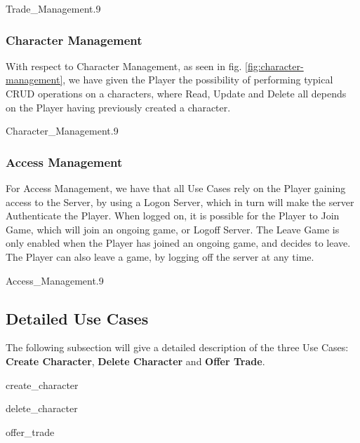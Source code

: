 \begin{myfigure}{Trade_Management}{.9}%
	\caption{Trade Management}
	\label{fig:trade-management}
\end{myfigure}

\subsubsection*{Character Management}
With respect to Character Management, as seen in fig. \ref{fig:character-management}, we have given the Player the possibility of performing typical CRUD operations on a characters, where Read, Update and Delete all depends on the Player having previously created a character. 

\begin{myfigure}{Character_Management}{.9}%
	\caption{Character Management}
	\label{fig:character-management}
\end{myfigure}

\subsubsection*{Access Management}
For Access Management, we have that all Use Cases rely on the Player gaining access to the Server, by using a Logon Server, which in turn will make the server Authenticate the Player. When logged on, it is possible for the Player to Join Game, which will join an ongoing game, or Logoff Server. The Leave Game is only enabled when the Player has joined an ongoing game, and decides to leave. The Player can also leave a game, by logging off the server at any time. 

\begin{myfigure}{Access_Management}{.9}%
	\caption{Access Management}
	\label{fig:access-management}
\end{myfigure}

\newpage
\subsection{Detailed Use Cases}
\label{sec:detailedusecases}
The following subsection will give a detailed description of the three Use Cases: \textbf{Create Character}, \textbf{Delete Character} and \textbf{Offer Trade}.


{create_character}

\newpage
{delete_character}

\newpage
{offer_trade}